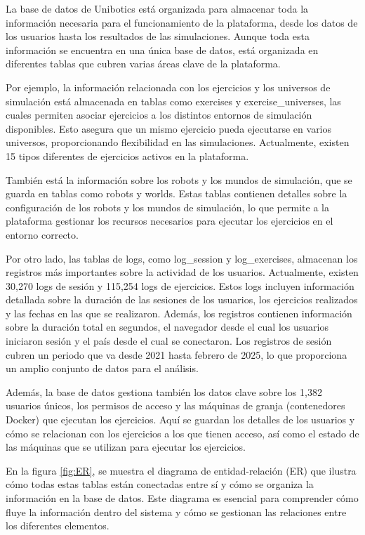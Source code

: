 \documentclass[a4paper, 12pt]{book}
\begin{document}
La base de datos de Unibotics está organizada para almacenar toda la información necesaria para el funcionamiento de la plataforma, desde los datos de los usuarios hasta los resultados de las simulaciones. Aunque toda esta información se encuentra en una única base de datos, está organizada en diferentes tablas que cubren varias áreas clave de la plataforma.

Por ejemplo, la información relacionada con los ejercicios y los universos de simulación está almacenada en tablas como exercises y exercise\_universes, las cuales permiten asociar ejercicios a los distintos entornos de simulación disponibles. Esto asegura que un mismo ejercicio pueda ejecutarse en varios universos, proporcionando flexibilidad en las simulaciones. Actualmente, existen 15 tipos diferentes de ejercicios activos en la plataforma.

También está la información sobre los robots y los mundos de simulación, que se guarda en tablas como robots y worlds. Estas tablas contienen detalles sobre la configuración de los robots y los mundos de simulación, lo que permite a la plataforma gestionar los recursos necesarios para ejecutar los ejercicios en el entorno correcto.

Por otro lado, las tablas de logs, como log\_session y log\_exercises, almacenan los registros más importantes sobre la actividad de los usuarios. Actualmente, existen 30,270 logs de sesión y 115,254 logs de ejercicios. Estos logs incluyen información detallada sobre la duración de las sesiones de los usuarios, los ejercicios realizados y las fechas en las que se realizaron. Además, los registros contienen información sobre la duración total en segundos, el navegador desde el cual los usuarios iniciaron sesión y el país desde el cual se conectaron. Los registros de sesión cubren un periodo que va desde 2021 hasta febrero de 2025, lo que proporciona un amplio conjunto de datos para el análisis.

Además, la base de datos gestiona también los datos clave sobre los 1,382 usuarios únicos, los permisos de acceso y las máquinas de granja (contenedores Docker) que ejecutan los ejercicios. Aquí se guardan los detalles de los usuarios y cómo se relacionan con los ejercicios a los que tienen acceso, así como el estado de las máquinas que se utilizan para ejecutar los ejercicios.

En la figura \ref{fig:ER}, se muestra el diagrama de entidad-relación (ER) que ilustra cómo todas estas tablas están conectadas entre sí y cómo se organiza la información en la base de datos. Este diagrama es esencial para comprender cómo fluye la información dentro del sistema y cómo se gestionan las relaciones entre los diferentes elementos.
\end{document}
